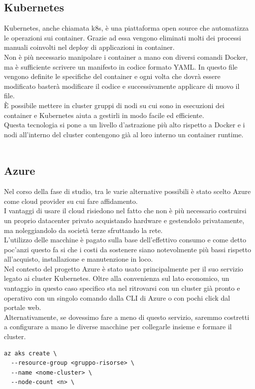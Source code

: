 \documentclass[a4paper,12pt]{report}
\begin{document}
\subsection{Kubernetes}
Kubernetes, anche chiamata k8s, è una piattaforma open source che automatizza le operazioni sui container. Grazie ad essa vengono eliminati molti dei processi manuali coinvolti nel deploy di applicazioni in container. \\
Non è più necessario manipolare i container a mano con diversi comandi Docker, ma è sufficiente scrivere un manifesto in codice formato YAML. In questo file vengono definite le specifiche del container e ogni volta che dovrà essere modificato basterà modificare il codice e successivamente applicare di nuovo il file. \\
È possibile mettere in cluster gruppi di nodi su cui sono in esecuzioni dei container e Kubernetes aiuta a gestirli in modo facile ed efficiente.\\
Questa tecnologia si pone a un livello d'astrazione più alto rispetto a Docker e i nodi all'interno del cluster contengono già al loro interno un container runtime.\cite{kubernetes}\\ \\

\subsection{Azure}
Nel corso della fase di studio, tra le varie alternative possibili è stato scelto Azure come cloud provider su cui fare affidamento.\\
I vantaggi di usare il cloud risiedono nel fatto che non è più necessario costruirsi un proprio datacenter privato acquistando hardware e gestendolo privatamente, ma noleggiandolo da società terze sfruttando la rete.\cite{cloud}\\
L'utilizzo delle macchine è pagato sulla base dell'effettivo consumo e come detto poc'anzi questo fa si che i costi da sostenere siano notevolmente più bassi rispetto all'acquisto, installazione e manutenzione in loco.\\
Nel contesto del progetto Azure è stato usato principalmente per il suo servizio legato ai cluster Kubernetes. Oltre alla convenienza sul lato economico, un vantaggio in questo caso specifico sta nel ritrovarsi con un cluster già pronto e operativo con un singolo comando dalla CLI di Azure o con pochi click dal portale web.\\
Alternativamente, se dovessimo fare a meno di questo servizio, saremmo costretti a configurare a mano le diverse macchine per collegarle insieme e formare il cluster.
\begin{lstlisting}[caption={\\Esempio di comando per creare un cluster Kubernetes come servizio di Azure da Azure CLI.}]
az aks create \
  --resource-group <gruppo-risorse> \
  --name <nome-cluster> \
  --node-count <n> \
\end{lstlisting}
\end{document}
